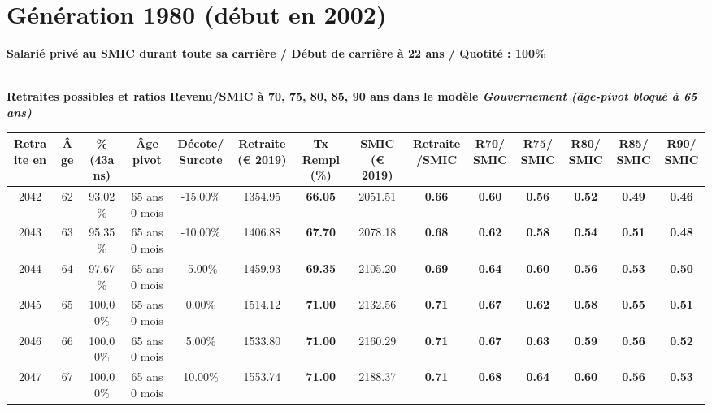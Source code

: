 \newpage 
 
\section{Génération 1980 (début en 2002)\label{SMIC_100_22_1980_0}} 
 
{\bf \noindent Salarié privé au SMIC durant toute sa carrière / Début de carrière à 22 ans / Quotité : 100\%}  ~ 

 ~\\{\bf \noindent Retraites possibles et ratios Revenu/SMIC à 70, 75, 80, 85, 90 ans dans le modèle \emph{Gouvernement (âge-pivot bloqué à 65 ans)}}  
 
\begin{adjustbox}{max width=\textwidth} 
\begin{tabular}[htb]{|c|c||c|c|c||c|c||c|c||c|c|c|c|c|} 
\hline 
 Retraite en &  Âge &  \%(43ans) &  Âge pivot &  Décote/Surcote &  Retraite (\euro{} 2019) &  Tx Rempl(\%) &  SMIC (\euro{} 2019) &  Retraite/SMIC &  R70/SMIC &  R75/SMIC &  R80/SMIC &  R85/SMIC &  R90/SMIC \\ 
\hline \hline 
 2042 &  62 &  93.02\% &  65 ans 0 mois &  -15.00\% &  1354.95 &  {\bf 66.05} &  2051.51 &  {\bf {\color{red} 0.66}} &  {\bf {\color{red} 0.60}} &  {\bf {\color{red} 0.56}} &  {\bf {\color{red} 0.52}} &  {\bf {\color{red} 0.49}} &  {\bf {\color{red} 0.46}} \\ 
\hline 
 2043 &  63 &  95.35\% &  65 ans 0 mois &  -10.00\% &  1406.88 &  {\bf 67.70} &  2078.18 &  {\bf {\color{red} 0.68}} &  {\bf {\color{red} 0.62}} &  {\bf {\color{red} 0.58}} &  {\bf {\color{red} 0.54}} &  {\bf {\color{red} 0.51}} &  {\bf {\color{red} 0.48}} \\ 
\hline 
 2044 &  64 &  97.67\% &  65 ans 0 mois &  -5.00\% &  1459.93 &  {\bf 69.35} &  2105.20 &  {\bf {\color{red} 0.69}} &  {\bf {\color{red} 0.64}} &  {\bf {\color{red} 0.60}} &  {\bf {\color{red} 0.56}} &  {\bf {\color{red} 0.53}} &  {\bf {\color{red} 0.50}} \\ 
\hline 
 2045 &  65 &  100.00\% &  65 ans 0 mois &  0.00\% &  1514.12 &  {\bf 71.00} &  2132.56 &  {\bf {\color{red} 0.71}} &  {\bf {\color{red} 0.67}} &  {\bf {\color{red} 0.62}} &  {\bf {\color{red} 0.58}} &  {\bf {\color{red} 0.55}} &  {\bf {\color{red} 0.51}} \\ 
\hline 
 2046 &  66 &  100.00\% &  65 ans 0 mois &  5.00\% &  1533.80 &  {\bf 71.00} &  2160.29 &  {\bf {\color{red} 0.71}} &  {\bf {\color{red} 0.67}} &  {\bf {\color{red} 0.63}} &  {\bf {\color{red} 0.59}} &  {\bf {\color{red} 0.56}} &  {\bf {\color{red} 0.52}} \\ 
\hline 
 2047 &  67 &  100.00\% &  65 ans 0 mois &  10.00\% &  1553.74 &  {\bf 71.00} &  2188.37 &  {\bf {\color{red} 0.71}} &  {\bf {\color{red} 0.68}} &  {\bf {\color{red} 0.64}} &  {\bf {\color{red} 0.60}} &  {\bf {\color{red} 0.56}} &  {\bf {\color{red} 0.53}} \\ 
\hline 
\hline 
\end{tabular} 
\end{adjustbox} 
 
